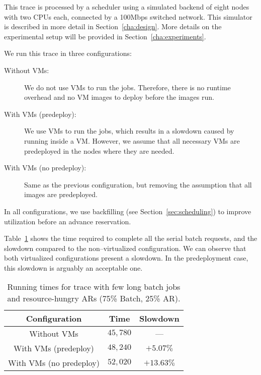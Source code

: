 This trace is processed by a scheduler using a simulated backend of eight nodes with two CPUs each, connected by a 100Mbps switched network. This simulator is described in more detail in Section~\ref{cha:design}. More details on the experimental setup will be provided in Section~\ref{cha:experiments}.

We run this trace in three configurations:

\begin{description}
\item[Without VMs:] We do not use VMs to run the jobs. Therefore, there is no runtime overhead and no VM images to deploy before the images run.
\item[With VMs (predeploy):] We use VMs to run the jobs, which results in a slowdown caused by running inside a VM. However, we assume that all necessary VMs are predeployed in the nodes where they are needed.
\item[With VMs (no predeploy):] Same as the previous configuration, but removing the assumption that all images are predeployed.
\end{description}

In all configurations, we use backfilling (see Section~\ref{sec:scheduling}) to improve utilization before an advance reservation.

Table~\ref{tab:longjoboverview} shows the time required to complete all the serial batch requests, and the slowdown compared to the non--virtualized configuration. We can observe that both virtualized configurations present a slowdown. In the predeployment case, this slowdown is arguably an acceptable one.

\begin{table}
\begin{center}
 \begin{tabular}{|c|c|c|}
\hline
 \textbf{Configuration} & \textbf{Time} & \textbf{Slowdown} \\\hline\hline
Without VMs & $45,780$ & --- \\\hline
With VMs (predeploy) & $48,240$ & $+5.07\%$ \\\hline 
With VMs (no predeploy) & $52,020$ & $+13.63\%$ \\\hline
\end{tabular}
\caption{Running times for trace with few long batch jobs and resource-hungry ARs (75\% Batch, 25\% AR).}
\label{tab:longjoboverview}
\end{center}
\end{table}


